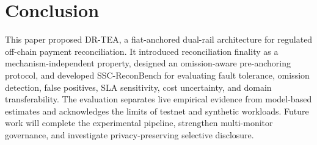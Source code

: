 \documentclass[journal]{IEEEtran}
\begin{document}
\section{Conclusion}
\label{sec:conclusion}

This paper proposed DR-TEA, a fiat-anchored dual-rail architecture for regulated off-chain payment reconciliation. It introduced reconciliation finality as a mechanism-independent property, designed an omission-aware pre-anchoring protocol, and developed SSC-ReconBench for evaluating fault tolerance, omission detection, false positives, SLA sensitivity, cost uncertainty, and domain transferability. The evaluation separates live empirical evidence from model-based estimates and acknowledges the limits of testnet and synthetic workloads. Future work will complete the experimental pipeline, strengthen multi-monitor governance, and investigate privacy-preserving selective disclosure.
\end{document}
